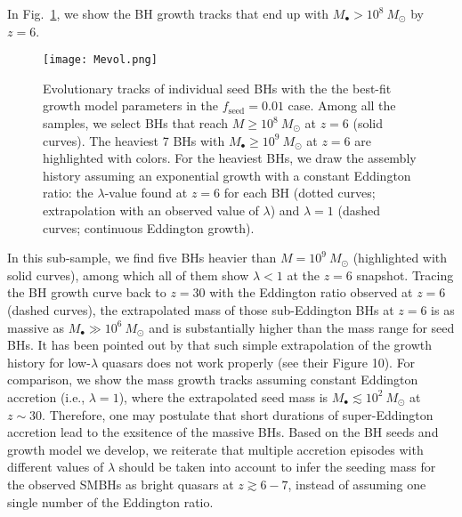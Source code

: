 \documentclass[twocolumn, twocolappendix]{aastex63}
\newcommand{\Msun}{M_\odot}
\newcommand{\Mbh}{M_\bullet}
\newcommand{\fseed}{f_\mathrm{seed}}
\begin{document}
\begin{CJK*}{UTF8}{gbsn}
In Fig.~\ref{fig:track}, we show the BH growth tracks that end up with $M_\bullet>10^8~\Msun$ by $z=6$.
%
\begin{figure}
\centering
\texttt{[image: Mevol.png]}
\caption{
Evolutionary tracks of individual seed BHs with the the best-fit growth model parameters in the $\fseed=0.01$ case.
Among all the samples, we select BHs that reach $M\geq 10^8~\Msun$ at $z=6$ (solid curves). 
The heaviest 7 BHs with $M_\bullet \geq 10^9~\Msun$ at $z=6$ are highlighted with colors. 
For the heaviest BHs, we draw the assembly history assuming an exponential growth with a constant Eddington ratio: 
the $\lambda$-value found at $z=6$ for each BH (dotted curves; extrapolation with an observed value of $\lambda$) and 
$\lambda =1$ (dashed curves; continuous Eddington growth).
}
\label{fig:track}
\end{figure}
%
%
In this sub-sample, we find five BHs heavier than $M=10^9~\Msun$ (highlighted with solid curves),
among which all of them show $\lambda<1$ at the  $z=6$ snapshot.
Tracing the BH growth curve back to $z=30$ with the Eddington ratio observed at $z=6$ (dashed curves),
the extrapolated mass of those sub-Eddington BHs at $z=6$ is as massive as $\Mbh \gg 10^6~\Msun$ and is 
substantially higher than the mass range for seed BHs.
%
It has been pointed out by \cite{2019ApJ...880...77O} that such simple extrapolation of the growth history for low-$\lambda$ quasars 
does not work properly (see their Figure 10).
For comparison, we show the mass growth tracks assuming constant Eddington accretion (i.e., $\lambda=1$),
where the extrapolated seed mass is $\Mbh \lesssim 10^2~\Msun$ at $z\sim 30$.
Therefore, one may postulate that short durations of super-Eddington accretion lead to the exsitence of the massive BHs.
Based on the BH seeds and growth model we develop,
we reiterate that multiple accretion episodes with different values of $\lambda$ should be taken into account 
to infer the seeding mass for the observed SMBHs as bright quasars at $z\gtrsim 6-7$,
instead of assuming one single number of the Eddington ratio.



\end{CJK*}
\end{document}
